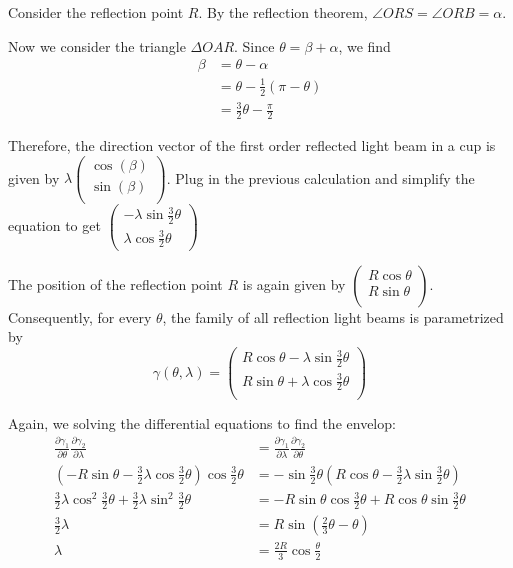\documentclass[a4paper]{article}
\begin{document}
Consider the reflection point $R$. By the reflection theorem, $\angle ORS = \angle ORB = \alpha$.

Now we consider the triangle $\Delta OAR$. Since $\theta = \beta +\alpha$, we find
\begin{align*}
\beta &= \theta - \alpha\\
&= \theta - \frac{1}{2}(\pi-\theta)\\
&=\frac{3}{2}\theta-\frac{\pi}{2}
\end{align*}

Therefore, the direction vector of the first order reflected light beam in a cup is given by $\lambda
\begin{pmatrix}
\cos (\beta)\\
\sin (\beta)\\
\end{pmatrix}$. Plug in the previous calculation and simplify the equation to get $\begin{pmatrix}
-\lambda \sin \frac{3}{2}\theta\\
\lambda \cos \frac{3}{2}\theta
\end{pmatrix}$

The position of the reflection point $R$ is again given by $\begin{pmatrix}
R \cos \theta\\
R \sin \theta\\
\end{pmatrix}$. Consequently, for every $\theta$, the family of all reflection light beams is parametrized by
$$\gamma(\theta,\lambda) =
\begin{pmatrix}
R \cos \theta - \lambda \sin \frac{3}{2}\theta\\
R \sin \theta + \lambda \cos \frac{3}{2}\theta\\
\end{pmatrix}$$

Again, we solving the differential equations to find the envelop:
\begin{align*}
\frac{\partial \gamma_1}{\partial \theta}\frac{\partial \gamma_2}{\partial \lambda} &= \frac{\partial \gamma_1}{\partial \lambda}\frac{\partial \gamma_2}{\partial \theta}\\
(-R\sin \theta - \frac{3}{2}\lambda \cos \frac{3}{2}\theta)\cos \frac{3}{2}\theta &= -\sin \frac{3}{2}\theta (R\cos \theta - \frac{3}{2}\lambda \sin \frac{3}{2}\theta)\\
\frac{3}{2}\lambda \cos^2 \frac{3}{2}\theta + \frac{3}{2}\lambda \sin^2 \frac{3}{2}\theta &= -R \sin \theta \cos \frac{3}{2}\theta + R \cos \theta \sin \frac{3}{2}\theta\\
\frac{3}{2}\lambda &= R\sin (\frac{2}{3} \theta - \theta)\\
\lambda &= \frac{2R}{3}\cos \frac{\theta}{2}
\end{align*}
\end{document}
